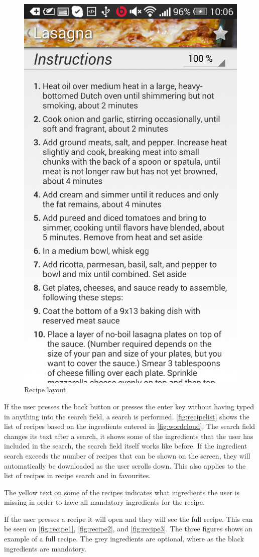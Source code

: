 \begin{figure}[H]
\begin{minipage}[t]{0.5\columnwidth}
\includegraphics[width=0.7\columnwidth]{img/screenshots/finalrecipe3.png}
\caption{Recipe layout\label{fig:recipe3}}
\end{minipage}
\end{figure}
If the user presses the back button or presses the enter key without having typed in anything into the search field, a search is performed. \autoref{fig:recipelist} shows the list of recipes based on the ingredients entered in \autoref{fig:wordcloud}. The search field changes its text after a search, it shows some of the ingredients that the user has included in the search, the search field itself works like before. If the ingredient search exceeds the number of recipes that can be shown on the screen, they will automatically be downloaded as the user scrolls down. This also applies to the list of recipes in recipe search and in favourites.


The yellow text on some of the recipes indicates what ingredients the user is missing in order to have all mandatory ingredients for the recipe.

If the user presses a recipe it will open and they will see the full recipe. This can be seen on \autoref{fig:recipe1}, \autoref{fig:recipe2}, and \autoref{fig:recipe3}. The three figures shows an example of a full recipe. The grey ingredients are optional, where as the black ingredients are mandatory. 


